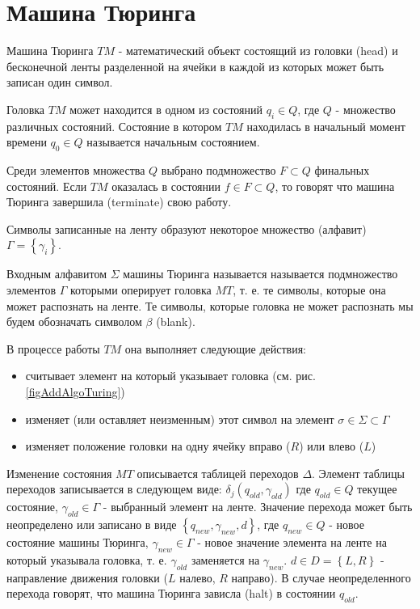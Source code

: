\section{Машина Тюринга}
\label{addTuring}

Машина Тюринга $TM$ - математический объект состоящий из
головки (head) и бесконечной ленты разделенной на ячейки в каждой из
которых может быть записан один символ.



Головка $TM$ может находится в одном из состояний $q_i \in Q$, где $Q$
- множество различных состояний. Состояние в котором $TM$ находилась в
начальный момент времени $q_0 \in Q$ называется начальным состоянием. 

Среди элементов множества $Q$ выбрано подмножество $F \subset Q$
финальных состояний. Если $TM$ оказалась в состоянии $f \in F \subset
Q$, то говорят что машина Тюринга завершила (terminate) свою работу.

Символы записанные на ленту образуют некоторое множество (алфавит)
$\Gamma = \left\{\gamma_i\right\}$.

Входным алфавитом $\Sigma$ машины Тюринга называется называется
подмножество элементов $\Gamma$ которыми оперирует головка $MT$,
т. е. те символы, которые она может распознать на ленте. Те символы,
которые головка не может распознать мы будем обозначать символом
$\beta$ (blank).

В процессе работы $TM$ она выполняет следующие действия:
\begin{itemize}
\item{считывает элемент на который указывает головка
  (см. рис. \ref{figAddAlgoTuring})}
\item{изменяет (или оставляет неизменным) этот символ на элемент
  $\sigma \in \Sigma \subset \Gamma$}
\item{изменяет положение головки на одну ячейку вправо ($R$) или влево
($L$)}
\end{itemize}

Изменение состояния $MT$ описывается таблицей переходов
$\Delta$. Элемент таблицы переходов записывается в следующем виде: 
$\delta_j\left(q_{old}, \gamma_{old}\right)$ где $q_{old} \in Q$ текущее состояние,
$\gamma_{old} \in \Gamma$ - выбранный элемент на ленте. Значение
перехода может быть 
неопределено или записано в виде $\left\{q_{new}, \gamma_{new}, d\right\}$, где
$q_{new} \in Q$ - новое состояние машины Тюринга, $\gamma_{new} \in \Gamma$ -
новое значение элемента на ленте на который указывала головка,
т. е. $\gamma_{old}$ заменяется на $\gamma_{new}$. $d \in D =
\left\{L, R\right\}$ - направление
движения головки ($L$ налево, $R$ направо). В случае неопределенного
перехода говорят, что машина Тюринга зависла (halt) в состоянии $q_{old}$.



